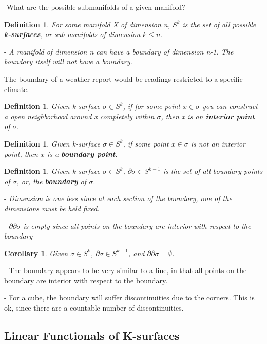 \documentclass{book}
\newtheorem{defn}[equation]{Definition}
\newtheorem{coro}[equation]{Corollary}
\begin{document}
-What are the possible submanifolds of a given manifold?


\begin{defn}
	For some manifold X of dimension n, $S^k$ is the set of all possible \textbf{k-surfaces}, or sub-manifolds of dimension $k \leq n$. 
\end{defn}

- \emph{A manifold of dimension n can have a boundary of dimension n-1. The boundary itself will not have a boundary.}

The boundary of a weather report would be readings restricted to a specific climate. 


\begin{defn}
	Given k-surface $\sigma \in S^k$, if for some point $x \in \sigma$ you can construct a open neighborhood around x completely within $\sigma$, then x is an \textbf{interior point} of $\sigma$. 
\end{defn}

\begin{defn}
	Given k-surface $\sigma \in S^k$, if some point $x \in \sigma$ is not an interior point, then $x$ is a \textbf{boundary point}.
\end{defn}

\begin{defn}
	Given k-surface $\sigma \in S^k$, $\partial\sigma \in S^{k-1}$ is the set of all boundary points of $\sigma$, or, the \textbf{boundary} of $\sigma$. 
\end{defn}

- \emph{Dimension is one less since at each section of the boundary, one of the dimensions must be held fixed. }

- \emph{$\partial\partial\sigma$ is empty since all points on the boundary are interior with respect to the boundary}


\begin{coro}
	Given $\sigma \in S^k$, $\partial\sigma \in S^{k-1}$, and $\partial\partial\sigma = \emptyset$. 
\end{coro}


- The boundary appears to be very similar to a line, in that all points on the boundary are interior with respect to the boundary. 

- For a cube, the boundary will suffer discontinuities due to the corners. This is ok, since there are a countable number of discontinuities. 

\subsection{Linear Functionals of K-surfaces}
\end{document}
